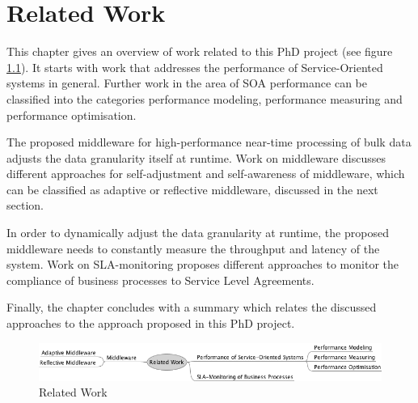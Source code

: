 \chapter{Related Work}\label{ch:related_work}

This chapter gives an overview of work related to this PhD project (see figure \ref{fig:related_work_map}). It starts with work that addresses the performance of Service-Oriented systems in general. Further work in the area of SOA performance can be classified into the categories performance modeling, performance measuring and performance optimisation.

The proposed middleware for high-performance near-time processing of bulk data adjusts the data granularity itself at runtime. Work on middleware discusses different approaches for self-adjustment and self-awareness of middleware, which can be classified as adaptive or reflective middleware, discussed in the next section.

In order to dynamically adjust the data granularity at runtime, the proposed middleware needs to constantly measure the throughput and latency of the system. Work on SLA-monitoring proposes different approaches to monitor the compliance of business processes to Service Level Agreements.

Finally, the chapter concludes with a summary which relates the discussed approaches to the approach proposed in this PhD project.
\begin{figure}[htbp]
	\centering
	\includegraphics[width=\textwidth]{img/related_work_map.png}
	\caption{Related Work}
	\label{fig:related_work_map}
\end{figure}
